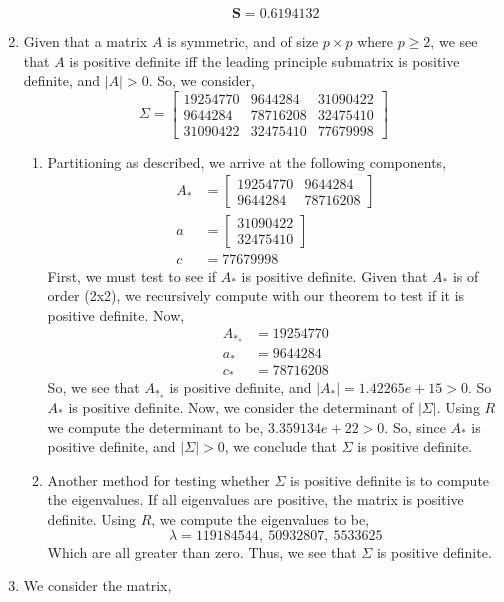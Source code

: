 \documentclass[letterpaper,10pt]{article}
\begin{document}
\begin{enumerate}
\begin{enumerate}
\[\textbf{S} = 0.6194132\]
\end{enumerate}
\item Given that a matrix $A$ is symmetric, and of size $p\times p$ where $p\geq 2$, we see that $A$ is positive definite iff the leading principle submatrix is positive definite, and $|A|>0$. So, we consider,
\[\Sigma=\begin{bmatrix}
19254770 & 9644284 & 31090422\\
9644284 & 78716208 & 32475410\\
31090422 & 32475410 & 77679998
\end{bmatrix}\]
\begin{enumerate}
\item Partitioning as described, we arrive at the following components,
\begin{align*}
A_* &= \begin{bmatrix}
19254770 & 9644284\\
9644284 & 78716208
\end{bmatrix}\\
a &= \begin{bmatrix}
31090422\\32475410
\end{bmatrix}\\
c &= 77679998
\end{align*}
First, we must test to see if $A_*$ is positive definite. Given that $A_*$ is of order (2x2), we recursively compute with our theorem to test if it is positive definite. Now,
\begin{align*}
A_{*_*} &= 19254770\\
a_* &= 9644284\\
c_* &= 78716208
\end{align*}
So, we see that $A_{*_*}$ is positive definite, and $|A_*|=1.42265e+15>0$. So $A_*$ is positive definite. Now, we consider the determinant of $|\Sigma|$. Using $R$ we compute the determinant to be, $3.359134e+22>0$. So, since $A_*$ is positive definite, and $|\Sigma|>0$, we conclude that $\Sigma$ is positive definite.
\item Another method for testing whether $\Sigma$ is positive definite is to compute the eigenvalues. If all eigenvalues are positive, the matrix is positive definite. Using $R$, we compute the eigenvalues to be,
\[\lambda =119184544,\  50932807,\   5533625\]
Which are all greater than zero. Thus, we see that $\Sigma$ is positive definite.
\end{enumerate}
\item We consider the matrix,

\end{enumerate}
\end{document}
